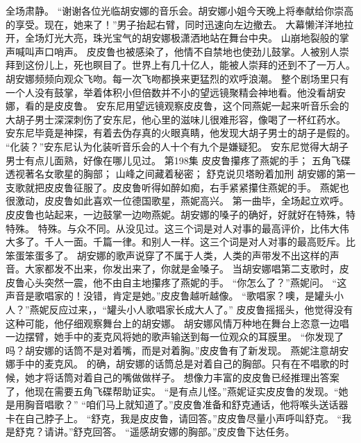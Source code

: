 \documentclass[a4paper,12pt,UTF8,twoside]{ctexbook}
\begin{document}
        全场肃静。 
        “谢谢各位光临胡安娜的音乐会。胡安娜小姐今天晚上将奉献给你崇高的享受。现在，她来了！”男子抬起右臂，同时迅速向左边撤去。 
        大幕懒洋洋地拉开，全场灯光大亮，珠光宝气的胡安娜极潇洒地站在舞台中央。 
        山崩地裂般的掌声喊叫声口哨声。 
        皮皮鲁也被感染了，他情不自禁地也使劲儿鼓掌。人被别人崇拜到这份儿上，死也瞑目了。世界上有几十亿人，能被人崇拜的还到不了一万人。 
        胡安娜频频向观众飞吻。每一次飞吻都换来更猛烈的欢呼浪潮。 
        整个剧场里只有一个人没有鼓掌，举着体积小但倍数并不小的望远镜聚精会神地看。他没看胡安娜，看的是皮皮鲁。 
        安东尼用望远镜观察皮皮鲁，这个同燕妮一起来听音乐会的大胡子男士深深刺伤了安东尼，他心里的滋味儿很难形容，像喝了一杯红药水。 
        安东尼毕竟是神探，有着去伪存真的火眼真睛，他发现大胡子男士的胡子是假的。 
        “化装？”安东尼认为化装听音乐会的人十个有九个是嫌疑犯。 
        安东尼觉得大胡子男士有点儿面熟，好像在哪儿见过。   第198集 
        皮皮鲁攥疼了燕妮的手； 
        五角飞碟透视著名女歌星的胸部； 
        山峰之间藏着秘密； 
        舒克说贝塔盼着加刑   
        胡安娜的第一支歌就把皮皮鲁征服了。皮皮鲁听得如醉如痴，右手紧紧攥住燕妮的手。 
        燕妮也很激动，皮皮鲁如此喜欢一位德国歌星，燕妮高兴。 
        第一曲毕，全场起立欢呼。 
        皮皮鲁也站起来，一边鼓掌一边吻燕妮。胡安娜的嗓子的确好，好就好在特殊，特特殊。 
        特殊。与众不同。从没见过。这三个词是对人对事的最高评价，比伟大伟大多了。千人一面。千篇一律。和别人一样。这三个词是对人对事的最高贬斥。比笨蛋笨蛋多了。 
        胡安娜的歌声说穿了不属于人类，人类的声带发不出这样的声音。大家都发不出来，你发出来了，你就是金嗓子。 
        当胡安娜唱第二支歌时，皮皮鲁心头突然一震，他不由自主地攥疼了燕妮的手。 
        “你怎么了？”燕妮问。 
        “这声音是歌唱家的！没错，肯定是她。”皮皮鲁越听越像。 
        “歌唱家？噢，是罐头小人？”燕妮反应过来，，“罐头小人歌唱家长成大人了。” 
        皮皮鲁摇摇头，他觉得没有这种可能，他仔细观察舞台上的胡安娜。 
        胡安娜风情万种地在舞台上恣意一边唱一边摆臂，她手中的麦克风将她的歌声输送到每一位观众的耳膜里。 
        “你发现了吗？胡安娜的话筒不是对着嘴，而是对着胸。”皮皮鲁有了新发现。 
        燕妮注意胡安娜手中的麦克风。 
        的确，胡安娜的话筒总是对着自己的胸部。只有在不唱歌的时候，她才将话筒对着自己的嘴做做样子。 
          想像力丰富的皮皮鲁已经推理出答案了，他现在需要五角飞碟帮助证实。 
        “是有点儿怪。”燕妮证实皮皮鲁的发现。“她是用胸音唱歌？” 
        “咱们马上就知道了。”皮皮鲁准备和舒克通话，他将喉头送话器卡在自己脖子上。 
        “舒克，我是皮皮鲁，请回答。”皮皮鲁尽量小声呼叫舒克。 
        “我是舒克？请讲。”舒克回答。 
        “遥感胡安娜的胸部。”皮皮鲁下达任务。 
\end{document}
